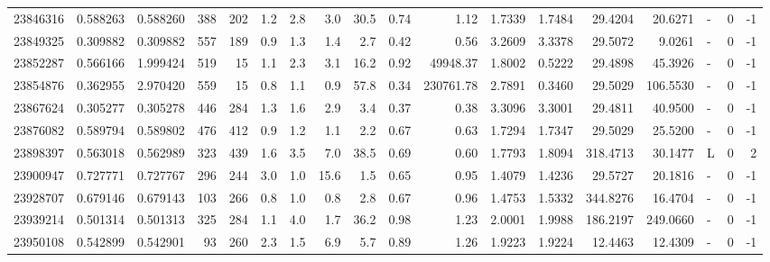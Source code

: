 \begin{tabular}{rrrrrrrrrrrrrrrlrr}
  23846316 & 0.588263 &   0.588260 &  388 &  202 &      1.2 &      2.8 &     3.0 &     30.5 &       0.74 &        1.12 &  1.7339 &  1.7484 &   29.4204 &   20.6271 &             - &        0 &         -1 \\
  23849325 & 0.309882 &   0.309882 &  557 &  189 &      0.9 &      1.3 &     1.4 &      2.7 &       0.42 &        0.56 &  3.2609 &  3.3378 &   29.5072 &    9.0261 &             - &        0 &         -1 \\
  23852287 & 0.566166 &   1.999424 &  519 &   15 &      1.1 &      2.3 &     3.1 &     16.2 &       0.92 &    49948.37 &  1.8002 &  0.5222 &   29.4898 &   45.3926 &             - &        0 &         -1 \\
  23854876 & 0.362955 &   2.970420 &  559 &   15 &      0.8 &      1.1 &     0.9 &     57.8 &       0.34 &   230761.78 &  2.7891 &  0.3460 &   29.5029 &  106.5530 &             - &        0 &         -1 \\
  23867624 & 0.305277 &   0.305278 &  446 &  284 &      1.3 &      1.6 &     2.9 &      3.4 &       0.37 &        0.38 &  3.3096 &  3.3001 &   29.4811 &   40.9500 &             - &        0 &         -1 \\
  23876082 & 0.589794 &   0.589802 &  476 &  412 &      0.9 &      1.2 &     1.1 &      2.2 &       0.67 &        0.63 &  1.7294 &  1.7347 &   29.5029 &   25.5200 &             - &        0 &         -1 \\
  23898397 & 0.563018 &   0.562989 &  323 &  439 &      1.6 &      3.5 &     7.0 &     38.5 &       0.69 &        0.60 &  1.7793 &  1.8094 &  318.4713 &   30.1477 &             L &        0 &          2 \\
  23900947 & 0.727771 &   0.727767 &  296 &  244 &      3.0 &      1.0 &    15.6 &      1.5 &       0.65 &        0.95 &  1.4079 &  1.4236 &   29.5727 &   20.1816 &             - &        0 &         -1 \\
  23928707 & 0.679146 &   0.679143 &  103 &  266 &      0.8 &      1.0 &     0.8 &      2.8 &       0.67 &        0.96 &  1.4753 &  1.5332 &  344.8276 &   16.4704 &             - &        0 &         -1 \\
  23939214 & 0.501314 &   0.501313 &  325 &  284 &      1.1 &      4.0 &     1.7 &     36.2 &       0.98 &        1.23 &  2.0001 &  1.9988 &  186.2197 &  249.0660 &             - &        0 &         -1 \\
  23950108 & 0.542899 &   0.542901 &   93 &  260 &      2.3 &      1.5 &     6.9 &      5.7 &       0.89 &        1.26 &  1.9223 &  1.9224 &   12.4463 &   12.4309 &             - &        0 &         -1 \\

\end{tabular}
